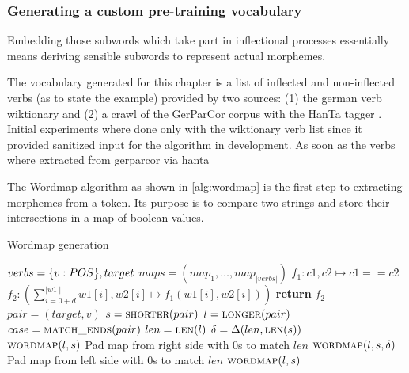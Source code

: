 \subsubsection{Generating a custom pre-training vocabulary}
\label{subsubsec:generating-a-custom-pre-training-vocabulary}

Embedding those subwords which take part in inflectional processes essentially means deriving sensible subwords to represent actual morphemes.

The vocabulary generated for this chapter is a list of inflected and non-inflected verbs (as to state the example) provided by two sources: (1) the german verb wiktionary and (2) a crawl of the GerParCor corpus with the HanTa tagger \cite{hanta}.
Initial experiments where done only with the wiktionary verb list since it provided sanitized input for the algorithm in development.
As soon as the verbs where extracted from \ac{gerparcor} via \ac{hanta}

The Wordmap algorithm as shown in \autoref{alg:wordmap} is the first step to extracting morphemes from a token.
Its purpose is to compare two strings and store their intersections in a map of boolean values.


\algrenewcommand{}
\algrenewcommand{}
\begin{algorithm}
    \caption{Wordmap generation}\label{alg:wordmap}
    \begin{algorithmic}[1]
        \Require $verbs = \{v : \uppercase{POS}\}, target$ 
        \Ensure $maps = (map_{1}, \ldots, map_{|verbs|})$
            \State $f_{1}: c1, c2 \mapsto c1 == c2$
            \State $f_{2}: \left(\sum_{i=0+d}^{\mid w1 \mid} w1[i], w2[i] \mapsto f_{1}(w1[i], w2[i])\right)$
            \State \textbf{return} $f_{2}$
        \EndFunction
        \\

        \State $pair = (target, v)$
        \State $s = \textsc{shorter}(pair)$
        \State $l = \textsc{longer}(pair)$
        \State $case = \textsc{match\_ends}(pair)$ 
        \State $len = \textsc{len}(l)$
        \State $\delta = \Delta(len, \textsc{len}(s))$
        \\

            \If{$\delta$}
                        \State $\textsc{wordmap}(l, s)$
                    \State Pad map from right side with 0s to match $len$
                \EndIf
                        \State $\textsc{wordmap}(l, s, \delta)$
                    \State Pad map from left side with 0s to match $len$
                \EndIf
            \Else
                \State $\textsc{wordmap}(l, s)$
            \EndIf
        \EndIf
        \EndFor

    \end{algorithmic}
\end{algorithm}

